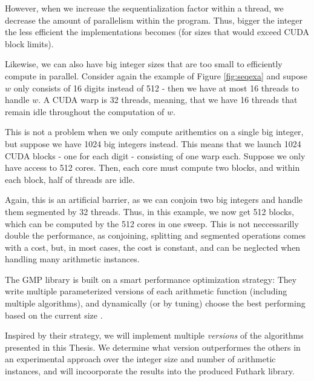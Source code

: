 However, when we increase the sequentialization factor within a thread, we
decrease the amount of parallelism within the program. Thus, bigger the integer the
less efficient the implementations becomes (for sizes that would exceed CUDA
block limits).

Likewise, we can also have big integer sizes that are too small to efficiently
compute in parallel. Consider again the example of Figure \ref{fig:seqexa} and
supose $w$ only consists of 16 digits instead of 512 - then we have at most 16
threads to handle $w$. A CUDA warp is 32 threads, meaning, that we have 16
threads that remain idle throughout the computation of $w$.

This is not a problem when we only compute arithemtics on a single big integer,
but suppose we have 1024 big integers instead. This means that we launch 1024
CUDA blocks - one for each digit - consisting of one warp each. Suppose we only
have access to 512 cores. Then, each core must compute two blocks, and within
each block, half of threads are idle.

Again, this is an artificial barrier, as we can conjoin two big integers and
handle them segmented by 32 threads. Thus, in this example, we now get 512
blocks, which can be computed by the 512 cores in one sweep. This is not
neccessarilly double the performance, as conjoining, splitting and segmented
operations comes with a cost, but, in most cases, the cost is constant, and can
be neglected when handling many arithmetic instances.

The GMP library is built on a smart performance optimization strategy: They
write multiple parameterized versions of each arithmetic function (including
multiple algorithms), and dynamically (or by tuning) choose the best performing
based on the current size \cite{GMP}.

Inspired by their strategy, we will implement multiple \textit{versions} of the
algorithms presented in this Thesis. We determine what version outperformes the
others in an experimental approach over the integer size and number of
arithmetic instances, and will incoorporate the results into the produced
Futhark library.

